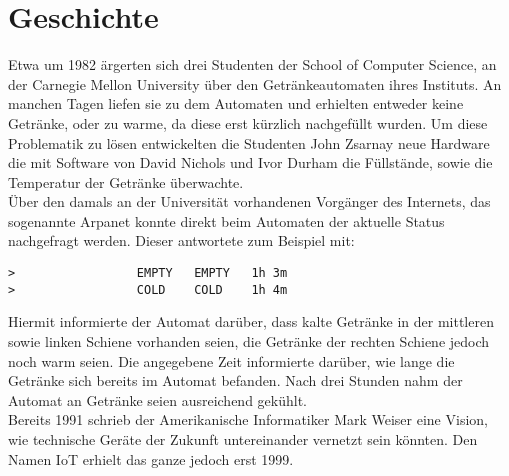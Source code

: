\section{Geschichte}\label{s:gechichte}

Etwa um 1982 ärgerten sich drei Studenten der School of Computer Science, an der Carnegie Mellon University über den Getränkeautomaten ihres Instituts. An manchen Tagen liefen sie zu dem Automaten und erhielten entweder keine Getränke, oder zu warme, da diese erst kürzlich nachgefüllt wurden. Um diese Problematik zu lösen entwickelten die Studenten John Zsarnay neue Hardware die mit Software von David Nichols und Ivor Durham die Füllstände, sowie die Temperatur der Getränke überwachte\cite{ws:cmu}.\\
Über den damals an der Universität vorhandenen Vorgänger des Internets, das sogenannte Arpanet konnte direkt beim Automaten der aktuelle Status nachgefragt werden. Dieser antwortete zum Beispiel mit:\\

\begin{lstlisting}[frame=single] 
>                 EMPTY   EMPTY   1h 3m
>                 COLD    COLD    1h 4m
\end{lstlisting}

Hiermit informierte der Automat darüber, dass kalte Getränke in der mittleren sowie linken Schiene vorhanden seien, die Getränke der rechten Schiene jedoch noch warm seien. Die angegebene Zeit informierte darüber, wie lange die Getränke sich bereits im Automat befanden. Nach drei Stunden nahm der Automat an Getränke seien ausreichend gekühlt.\\


Bereits 1991 schrieb der Amerikanische Informatiker Mark Weiser eine Vision, wie technische Geräte der Zukunft untereinander vernetzt sein könnten\cite{ws:weiser}. 
Den Namen \ac{IoT} erhielt das ganze jedoch erst 1999.
